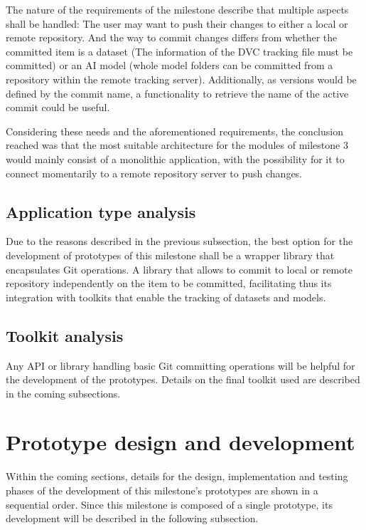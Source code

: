 The nature of the requirements of the milestone describe that multiple aspects shall be handled: The user may want to push their changes to either a local or remote repository. 
And the way to commit changes differs from whether the committed item is a dataset (The information of the DVC tracking file must be committed) or an \acrshort{AI} model (whole model folders can be committed from a repository within
the remote tracking server). Additionally, as versions would be defined by the commit name, a functionality to retrieve the name of the active commit could be useful.

Considering these needs and the aforementioned requirements, the conclusion reached was that the most suitable architecture for the modules of milestone 3 would mainly consist of
a monolithic application, with the possibility for it to connect momentarily to a remote repository server to push changes.

\subsection{Application type analysis}

Due to the reasons described in the previous subsection, the best option for the development of prototypes of this milestone shall be a wrapper library that encapsulates Git
operations. A library that allows to commit to local or remote repository independently on the item to be committed, facilitating thus its integration with toolkits that enable the 
tracking of datasets and models.

\subsection{Toolkit analysis}

Any API or library handling basic Git committing operations will be helpful for the development of the prototypes. Details on the final toolkit used are described in the coming subsections.

\section{Prototype design and development}

Within the coming sections, details for the design, implementation and testing phases of the development of this milestone's prototypes are shown in a sequential order. Since this milestone
is composed of a single prototype, its development will be described in the following subsection.

